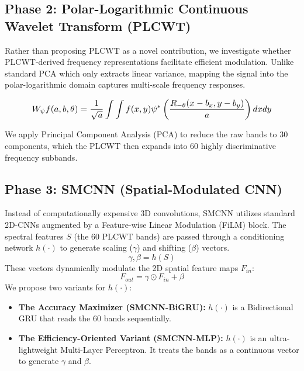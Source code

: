\documentclass[pdflatex,sn-mathphys-num,iicol]{sn-jnl}
\begin{document}
\subsection{Phase 2: Polar-Logarithmic Continuous Wavelet Transform (PLCWT)}
Rather than proposing PLCWT as a novel contribution, we investigate whether PLCWT-derived frequency representations facilitate efficient modulation. Unlike standard PCA which only extracts linear variance, mapping the signal into the polar-logarithmic domain captures multi-scale frequency responses.
\begin{small}
\begin{equation}
\resizebox{0.85\columnwidth}{!}{$\displaystyle W_{\psi}f(a, b, \theta) = \frac{1}{\sqrt{a}} \int \int f(x,y) \psi^* \left( \frac{R_{-\theta}(x-b_x, y-b_y)}{a} \right) dx dy$}
\end{equation}
\end{small}
We apply Principal Component Analysis (PCA) to reduce the raw bands to 30 components, which the PLCWT then expands into 60 highly discriminative frequency subbands.

\subsection{Phase 3: SMCNN (Spatial-Modulated CNN)}
Instead of computationally expensive 3D convolutions, SMCNN utilizes standard 2D-CNNs augmented by a Feature-wise Linear Modulation (FiLM) block. The spectral features $S$ (the 60 PLCWT bands) are passed through a conditioning network $h(\cdot)$ to generate scaling ($\gamma$) and shifting ($\beta$) vectors.
\begin{equation}
\gamma, \beta = h(S)
\end{equation}
These vectors dynamically modulate the 2D spatial feature maps $F_{in}$:
\begin{equation}
F_{out} = \gamma \odot F_{in} + \beta
\end{equation}
We propose two variants for $h(\cdot)$:
\begin{itemize}
    \item \textbf{The Accuracy Maximizer (SMCNN-BiGRU):} $h(\cdot)$ is a Bidirectional GRU that reads the 60 bands sequentially.
    \item \textbf{The Efficiency-Oriented Variant (SMCNN-MLP):} $h(\cdot)$ is an ultra-lightweight Multi-Layer Perceptron. It treats the bands as a continuous vector to generate $\gamma$ and $\beta$. 
\end{itemize}
\end{document}
